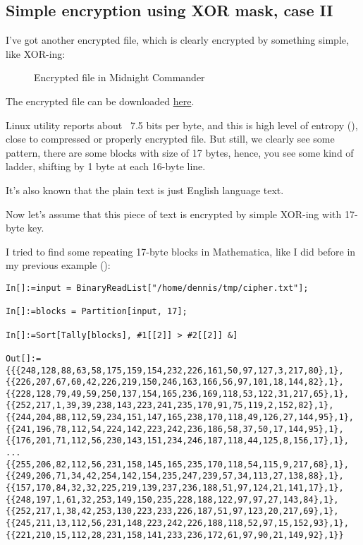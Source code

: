 \subsection{Simple encryption using XOR mask, case II}
\label{XOR_mask_2}

I've got another encrypted file, which is clearly encrypted by something simple, like XOR-ing:

\begin{figure}[H]
\centering
{}
\caption{Encrypted file in Midnight Commander}
\end{figure}

The encrypted file can be downloaded \href{https://github.com/dennis714/yurichev.com/blob/master/blog/XOR_mask_2/files/cipher.txt}{here}.

 Linux utility reports about ~7.5 bits per byte, and this is high level of entropy (),
close to compressed or properly encrypted file.
But still, we clearly see some pattern, there are some blocks with size of 17 bytes, hence, you see some kind of ladder, shifting by 1 byte at each 16-byte line.

It's also known that the plain text is just English language text.

Now let's assume that this piece of text is encrypted by simple XOR-ing with 17-byte key.

I tried to find some repeating 17-byte blocks in Mathematica, like I did before in my previous example ():

\begin{lstlisting}[caption=Mathematica]
In[]:=input = BinaryReadList["/home/dennis/tmp/cipher.txt"];

In[]:=blocks = Partition[input, 17];

In[]:=Sort[Tally[blocks], #1[[2]] > #2[[2]] &]

Out[]:={{{248,128,88,63,58,175,159,154,232,226,161,50,97,127,3,217,80},1},
{{226,207,67,60,42,226,219,150,246,163,166,56,97,101,18,144,82},1},
{{228,128,79,49,59,250,137,154,165,236,169,118,53,122,31,217,65},1},
{{252,217,1,39,39,238,143,223,241,235,170,91,75,119,2,152,82},1},
{{244,204,88,112,59,234,151,147,165,238,170,118,49,126,27,144,95},1},
{{241,196,78,112,54,224,142,223,242,236,186,58,37,50,17,144,95},1},
{{176,201,71,112,56,230,143,151,234,246,187,118,44,125,8,156,17},1},
...
{{255,206,82,112,56,231,158,145,165,235,170,118,54,115,9,217,68},1},
{{249,206,71,34,42,254,142,154,235,247,239,57,34,113,27,138,88},1},
{{157,170,84,32,32,225,219,139,237,236,188,51,97,124,21,141,17},1},
{{248,197,1,61,32,253,149,150,235,228,188,122,97,97,27,143,84},1},
{{252,217,1,38,42,253,130,223,233,226,187,51,97,123,20,217,69},1},
{{245,211,13,112,56,231,148,223,242,226,188,118,52,97,15,152,93},1},
{{221,210,15,112,28,231,158,141,233,236,172,61,97,90,21,149,92},1}}
\end{lstlisting}

